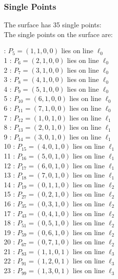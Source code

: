 \documentclass{article}
\begin{document}
{\subsubsection*{Single Points}
The surface has 35 single points:\\
The single points on the surface are:\\
\begin{multicols}{2}
 : $P_{5}=( 1, 1, 0, 0 )$ lies on line $\ell_{0}$\\
1 : $P_{6}=( 2, 1, 0, 0 )$ lies on line $\ell_{0}$\\
2 : $P_{7}=( 3, 1, 0, 0 )$ lies on line $\ell_{0}$\\
3 : $P_{8}=( 4, 1, 0, 0 )$ lies on line $\ell_{0}$\\
4 : $P_{9}=( 5, 1, 0, 0 )$ lies on line $\ell_{0}$\\
5 : $P_{10}=( 6, 1, 0, 0 )$ lies on line $\ell_{0}$\\
6 : $P_{11}=( 7, 1, 0, 0 )$ lies on line $\ell_{0}$\\
7 : $P_{12}=( 1, 0, 1, 0 )$ lies on line $\ell_{1}$\\
8 : $P_{13}=( 2, 0, 1, 0 )$ lies on line $\ell_{1}$\\
9 : $P_{14}=( 3, 0, 1, 0 )$ lies on line $\ell_{1}$\\
10 : $P_{15}=( 4, 0, 1, 0 )$ lies on line $\ell_{1}$\\
11 : $P_{16}=( 5, 0, 1, 0 )$ lies on line $\ell_{1}$\\
12 : $P_{17}=( 6, 0, 1, 0 )$ lies on line $\ell_{1}$\\
13 : $P_{18}=( 7, 0, 1, 0 )$ lies on line $\ell_{1}$\\
14 : $P_{19}=( 0, 1, 1, 0 )$ lies on line $\ell_{2}$\\
15 : $P_{27}=( 0, 2, 1, 0 )$ lies on line $\ell_{2}$\\
16 : $P_{35}=( 0, 3, 1, 0 )$ lies on line $\ell_{2}$\\
17 : $P_{43}=( 0, 4, 1, 0 )$ lies on line $\ell_{2}$\\
18 : $P_{51}=( 0, 5, 1, 0 )$ lies on line $\ell_{2}$\\
19 : $P_{59}=( 0, 6, 1, 0 )$ lies on line $\ell_{2}$\\
20 : $P_{67}=( 0, 7, 1, 0 )$ lies on line $\ell_{2}$\\
21 : $P_{83}=( 1, 1, 0, 1 )$ lies on line $\ell_{3}$\\
22 : $P_{91}=( 1, 2, 0, 1 )$ lies on line $\ell_{3}$\\
23 : $P_{99}=( 1, 3, 0, 1 )$ lies on line $\ell_{3}$\\

\end{multicols}}
\end{document}
